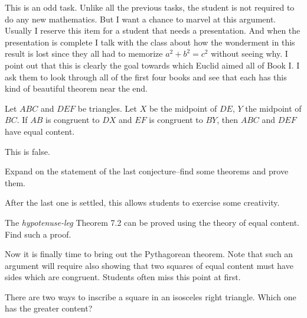 \begin{annotation}
{
\color{blue}
This is an odd task. Unlike all the previous tasks, the student is not required to do any new mathematics. But I want a chance to marvel at this argument. Usually I reserve this item for a student that needs a presentation. And when the presentation is complete I talk with the class about how the wonderment in this result is lost since they all had to memorize $a^2 + b^2 = c^2$ without seeing why. I point out that this is clearly the goal towards which Euclid aimed all of Book I. I ask them to look through all of the first four books and see that each has this kind of beautiful theorem near the end.
}
\end{annotation}

\begin{conjecture}\label{conj:false-area}
Let $ABC$ and $DEF$ be triangles. Let $X$ be the midpoint of $DE$, $Y$ the midpoint of $BC$. If $AB$ is congruent to $DX$ and $EF$ is congruent to $BY$, then $ABC$ and $DEF$ have equal content.
\end{conjecture}

\begin{annotation}
{
\color{blue}
This is false.
}
\end{annotation}

\begin{problem}\label{prob:expand-false-area}
Expand on the statement of the last conjecture--find some theorems and prove them.
\end{problem}

\begin{annotation}
{
\color{blue}
After the last one is settled, this allows students to exercise some creativity.
}
\end{annotation}

\begin{problem}\label{prob:RASS-area} 
The \emph{hypotenuse-leg} Theorem 7.2 can be proved using the theory of equal content. Find such a proof.
\end{problem}

\begin{annotation}
{
\color{blue}
Now it is finally time to bring out the Pythagorean theorem. Note that such an argument will require also showing that two squares of equal content must have sides which are congruent. Students often miss this point at first.
}
\end{annotation}

\begin{question}
There are two ways to inscribe a square in an isosceles right triangle. Which one has the greater content?
\end{question}

